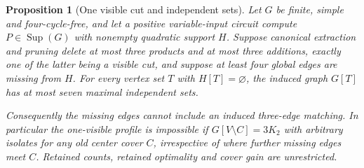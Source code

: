 \documentclass[11pt]{article}
\newcommand{\Sup}{\operatorname{Sup}}
\newtheorem{proposition}[theorem]{Proposition}
\theoremstyle{definition}
\theoremstyle{remark}
\begin{document}
\begin{proposition}[One visible cut and independent sets]\label{prop:onevisibleindependentsets}
Let $G$ be finite, simple and four-cycle-free, and let a positive variable-input circuit compute $P\in\Sup(G)$ with nonempty quadratic support $H$. Suppose canonical extraction and pruning delete at most three products and at most three additions, exactly one of the latter being a visible cut, and suppose at least four global edges are missing from $H$. For every vertex set $T$ with $H[T]=\varnothing$, the induced graph $G[T]$ has at most seven maximal independent sets.

Consequently the missing edges cannot include an induced three-edge matching. In particular the one-visible profile is impossible if $G[V\setminus C]=3K_2$ with arbitrary isolates for any old center cover $C$, irrespective of where further missing edges meet $C$. Retained counts, retained optimality and cover gain are unrestricted.
\end{proposition}
\end{document}
